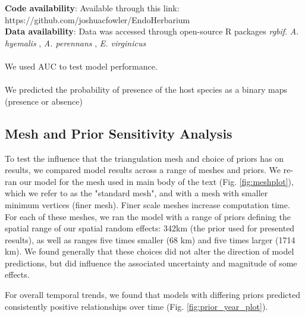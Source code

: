 \documentclass[11pt]{article}
\let\cite\citep
\begin{document}
\textbf{Code availability}: Available through this link: https://github.com/joshuacfowler/EndoHerbarium \\
\textbf{Data availability}: Data was accessed through open-source R packages \emph{rgbif}. \emph{A. hyemalis} \cite{https://doi.org/10.15468/dl.ryqqcv}, \emph{A. perennans} \cite{https://doi.org/10.15468/dl.wtne24}, \emph{E.  virginicus} \cite{https://doi.org/10.15468/dl.yt76uh} \\
{\color{blue}{Assessment}}\\
We used AUC to test model performance.\\
{\color{blue}{Prediction }}\\
We predicted the probability of presence of the host species as a binary maps (presence or absence)





\subsection*{Mesh and Prior Sensitivity Analysis}\label{sec:priorsensitivity}
To test the influence that the triangulation mesh and choice of priors has on results, we compared model results across a range of meshes and priors. We re-ran our model for the mesh used in main body of the text (Fig. \ref{fig:meshplot}), which we refer to as the "standard mesh", and with a mesh with smaller minimum vertices (finer mesh). Finer scale meshes increase computation time. For each of these meshes, we ran the model with a range of priors defining the spatial range of our spatial random effects: 342km (the prior used for presented results), as well as ranges five times smaller (68 km) and five times larger (1714 km). We found generally that these choices did not alter the direction of model predictions, but did influence the associated uncertainty and magnitude of some effects.

For overall temporal trends, we found that models with differing priors predicted consistently positive relationships over time (Fig. \ref{fig:prior_year_plot}). 
\end{document}
